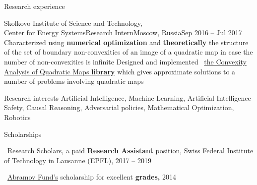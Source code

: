 \documentclass{resume} %
\newcommand{\mylink}{{\color{gray}\faExternalLink}}
\begin{document}
\begin{rSection}{Research experience}
	\begin{rSubsection}{Skolkovo Institute of Science and Technology, \\Center for Energy Systems}{Research Intern}{Moscow, Russia}{Sep 2016 -- Jul 2017}
		\myitem Characterized using {\bf numerical optimization} and {\bf theoretically} the structure of the set of boundary non-convexities of an image of a quadratic map in case the number of non-convexities is infinite
		\myitem Designed and implemented \mylink~\href{https://github.com/sergeivolodin/CAQM}{the Convexity Analysis of Quadratic Maps {\bf \color{black} library}} which gives approximate solutions to a number of problems involving quadratic maps
	\end{rSubsection}
	
	
\end{rSection}

\newpage

\begin{rSection}{Research interests}
	Artificial Intelligence, Machine Learning, Artificial Intelligence Safety, Causal Reasoning, Adversarial policies, Mathematical Optimization, Robotics %
\end{rSection}

\begin{rSection}{Scholarships}
	\vspace{-1em}
	\item \mylink~\href{https://ic.epfl.ch/ResearchScholars}{Research Scholars}, a paid {\bf Research Assistant} position, Swiss Federal Institute of Technology in Lausanne (EPFL), 2017 -- 2019
	\item \mylink~\href{http://phystech-foundation.org/}{Abramov Fund's} scholarship for excellent {\bf grades,} 2014
\end{rSection}
\end{document}
